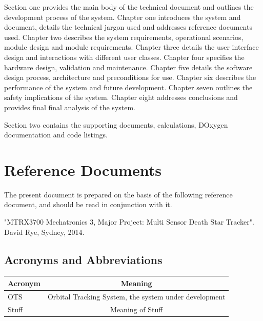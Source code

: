 \documentclass[]{report}
\begin{document}
Section one provides the main body of the technical document and outlines the development process of the system.\newline
Chapter one introduces the system and document, details the technical jargon used and addresses reference documents used. \newline
Chapter two describes the system requirements, operational scenarios, module design and module requirements. \newline
Chapter three details the user interface design and interactions with different user classes. \newline
Chapter four specifies the hardware design, validation and maintenance. \newline
Chapter five details the software design process, architecture and preconditions for use. \newline
Chapter six describes the performance of the system and future development. \newline
Chapter seven outlines the safety implications of the system. \newline
Chapter eight addresses conclusions and provides final final analysis of the system. \newline

Section two contains the supporting documents, calculations, DOxygen documentation and code listings.

\section{Reference Documents}
The present document is prepared on the basis of the following reference document, and should be read in conjunction with it.\newline 

"MTRX3700 Mechatronics 3, Major Project: Multi Sensor Death Star Tracker".  David Rye, Sydney, 2014.
\subsection{Acronyms and Abbreviations}

\begin{center}
	\begin{tabular}{| l | c |}
		\hline
		Acronym & Meaning \\ \hline \hline
		OTS & Orbital Tracking System, the system under development \\ \hline
		Stuff & Meaning of Stuff \\
		\hline
	\end{tabular}
\end{center}
\end{document}
